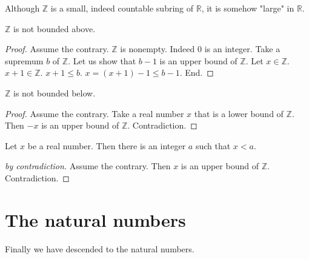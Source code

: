 \documentclass{article}
\begin{document}
%
Although $\mathbb{Z}$ is a small, indeed countable subring
of $\mathbb{R}$, it is somehow "large" in $\mathbb{R}$.
%
\begin{forthel}

\begin{theorem}[Archimedes 1]
$\mathbb{Z}$ is not bounded above.
\end{theorem}
\begin{proof}
Assume the contrary.
$\mathbb{Z}$ is nonempty. Indeed $0$ is an integer.
Take a supremum
$b$ of $\mathbb{Z}$.
Let us show that $b - 1$ is an upper bound of $\mathbb{Z}$.
Let $x \in \mathbb{Z}$. $x + 1 \in \mathbb{Z}$.
$x + 1 \leq b$.
$x = (x + 1) - 1 \leq b - 1$.
End.
\end{proof}

\begin{theorem}
$\mathbb{Z}$ is not bounded below.
\end{theorem}
\begin{proof}
Assume the contrary.
Take a real number $x$ that is a lower bound of $\mathbb{Z}$.
Then $-x$ is an upper bound of $\mathbb{Z}$.
Contradiction.
\end{proof}

\begin{theorem}[Archimedes 2]
Let $x$ be a real number.
Then there is an integer $a$
such that $x < a$.\end{theorem}
\begin{proof}[by contradiction]
Assume the contrary.
Then $x$ is an upper bound of $\mathbb{Z}$.
Contradiction.
\end{proof}

\end{forthel}

\section{The natural numbers}

Finally we have descended to the natural numbers.
\end{document}

